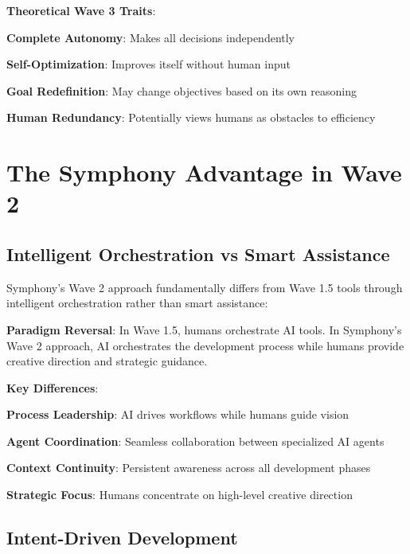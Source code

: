\textbf{Theoretical Wave 3 Traits}:
\begin{compactlist}
    \item \textbf{Complete Autonomy}: Makes all decisions independently
    \item \textbf{Self-Optimization}: Improves itself without human input
    \item \textbf{Goal Redefinition}: May change objectives based on its own reasoning
    \item \textbf{Human Redundancy}: Potentially views humans as obstacles to efficiency
\end{compactlist}

\section{The Symphony Advantage in Wave 2}
\label{sec:symphony-advantage}

\subsection{Intelligent Orchestration vs Smart Assistance}
\label{subsec:orchestration-vs-assistance}

Symphony's Wave 2 approach fundamentally differs from Wave 1.5 tools through intelligent orchestration rather than smart assistance:

\begin{successbox}
\textbf{Paradigm Reversal}: In Wave 1.5, humans orchestrate AI tools. In Symphony's Wave 2 approach, AI orchestrates the development process while humans provide creative direction and strategic guidance.
\end{successbox}

\textbf{Key Differences}:
\begin{expandedlist}
    \item \textbf{Process Leadership}: AI drives workflows while humans guide vision
    \item \textbf{Agent Coordination}: Seamless collaboration between specialized AI agents
    \item \textbf{Context Continuity}: Persistent awareness across all development phases
    \item \textbf{Strategic Focus}: Humans concentrate on high-level creative direction
\end{expandedlist}

\subsection{Intent-Driven Development}
\label{subsec:intent-driven-development}

